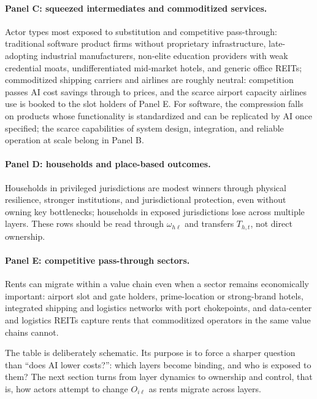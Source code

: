 \documentclass[11pt]{article}
\begin{document}
\paragraph{Panel C: squeezed intermediates and commoditized services.}
Actor types most exposed to substitution and competitive pass-through: traditional software product firms without proprietary infrastructure, late-adopting industrial manufacturers, non-elite education providers with weak credential moats, undifferentiated mid-market hotels, and generic office REITs; commoditized shipping carriers and airlines are roughly neutral: competition passes AI cost savings through to prices, and the scarce airport capacity airlines use is booked to the slot holders of Panel E. For software, the compression falls on products whose functionality is standardized and can be replicated by AI once specified; the scarce capabilities of system design, integration, and reliable operation at scale belong in Panel B.

\paragraph{Panel D: households and place-based outcomes.}
Households in privileged jurisdictions are modest winners through physical resilience, stronger institutions, and jurisdictional protection, even without owning key bottlenecks; households in exposed jurisdictions lose across multiple layers. These rows should be read through \(\omega_{h\ell}\) and transfers \(T_{h,t}\), not direct ownership.

\paragraph{Panel E: competitive pass-through sectors.}
Rents can migrate within a value chain even when a sector remains economically important: airport slot and gate holders, prime-location or strong-brand hotels, integrated shipping and logistics networks with port chokepoints, and data-center and logistics REITs capture rents that commoditized operators in the same value chains cannot.

The table is deliberately schematic. Its purpose is to force a sharper question than ``does AI lower costs?'': which layers become binding, and who is exposed to them? The next section turns from layer dynamics to ownership and control, that is, how actors attempt to change \(O_{i\ell}\) as rents migrate across layers.
\end{document}
